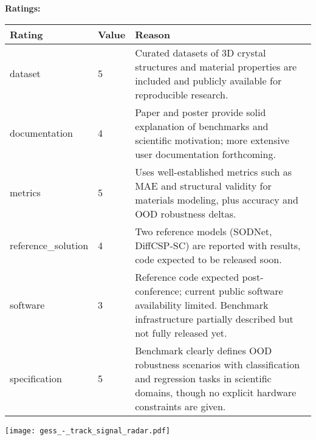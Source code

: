 {{{\bf Ratings:} ~ \\

\begin{tabular}{p{} p{} p{}}
\hline
Rating & Value & Reason \\
\hline
dataset & 5 & Curated datasets of 3D crystal structures and material properties are included and
publicly available for reproducible research.
 \\
documentation & 4 & Paper and poster provide solid explanation of benchmarks and scientific motivation;
more extensive user documentation forthcoming.
 \\
metrics & 5 & Uses well-established metrics such as MAE and structural validity for materials modeling,
plus accuracy and OOD robustness deltas.
 \\
reference\_solution & 4 & Two reference models (SODNet, DiffCSP-SC) are reported with results, code expected
to be released soon.
 \\
software & 3 & Reference code expected post-conference; current public software availability limited.
Benchmark infrastructure partially described but not fully released yet.
 \\
specification & 5 & Benchmark clearly defines OOD robustness scenarios with classification and regression
tasks in scientific domains, though no explicit hardware constraints are given.
 \\
\hline
\end{tabular}

\texttt{[image: gess\_-\_track\_signal\_radar.pdf]}
}}
\clearpage